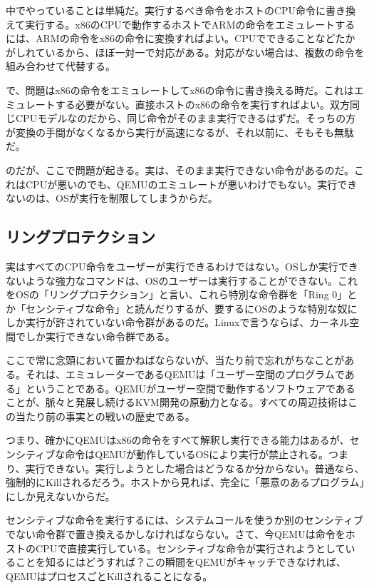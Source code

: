 \documentclass[9pt,b5paper,tombo]{jsbook}
\begin{document}
中でやっていることは単純だ。実行するべき命令をホストのCPU命令に書き換えて実行する。x86のCPUで動作するホストでARMの命令をエミュレートするには、ARMの命令をx86の命令に変換すればよい。CPUでできることなどたかがしれているから、ほぼ一対一で対応がある。対応がない場合は、複数の命令を組み合わせて代替する。

で、問題はx86の命令をエミュレートしてx86の命令に書き換える時だ。これはエミュレートする必要がない。直接ホストのx86の命令を実行すればよい。双方同じCPUモデルなのだから、同じ命令がそのまま実行できるはずだ。そっちの方が変換の手間がなくなるから実行が高速になるが、それ以前に、そもそも無駄だ。

のだが、ここで問題が起きる。実は、そのまま実行できない命令があるのだ。これはCPUが悪いのでも、QEMUのエミュレートが悪いわけでもない。実行できないのは、OSが実行を制限してしまうからだ。

\subsection{リングプロテクション}

実はすべてのCPU命令をユーザーが実行できるわけではない。OSしか実行できないような強力なコマンドは、OSのユーザーは実行することができない。これをOSの「リングプロテクション」と言い、これら特別な命令群を「Ring 0」とか「センシティブな命令」と読んだりするが、要するにOSのような特別な奴にしか実行が許されていない命令群があるのだ。Linuxで言うならば、カーネル空間でしか実行できない命令群である。

ここで常に念頭において置かねばならないが、当たり前で忘れがちなことがある。それは、エミュレーターであるQEMUは「ユーザー空間のプログラムである」ということである。QEMUがユーザー空間で動作するソフトウェアであることが、脈々と発展し続けるKVM開発の原動力となる。すべての周辺技術はこの当たり前の事実との戦いの歴史である。

つまり、確かにQEMUはx86の命令をすべて解釈し実行できる能力はあるが、センシティブな命令はQEMUが動作しているOSにより実行が禁止される。つまり、実行できない。実行しようとした場合はどうなるか分からない。普通なら、強制的にKillされるだろう。ホストから見れば、完全に「悪意のあるプログラム」にしか見えないからだ。

センシティブな命令を実行するには、システムコールを使うか別のセンシティブでない命令群で置き換えるかしなければならない。さて、今QEMUは命令をホストのCPUで直接実行している。センシティブな命令が実行されようとしていることを知るにはどうすれば？この瞬間をQEMUがキャッチできなければ、QEMUはプロセスごとKillされることになる。
\end{document}
